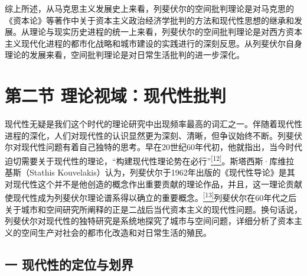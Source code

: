 \documentclass[UTF8, fontset = sourcesans, a4paper, oneside, zihao =
-4, scheme=chinese, no-math, space=true]{ctexbook}
\begin{document}
综上所述，从马克思主义发展史上来看，列斐伏尔的空间批判理论是对马克思的《资本论》等著作中关于资本主义政治经济学批判的方法和现代性思想的继承和发展。从理论与现实历史进程的统一上来看，列斐伏尔的空间批判理论是对西方资本主义现代化进程的都市化战略和城市建设的实践进行的深刻反思。从列斐伏尔自身理论的发展来看，空间批判理论是对日常生活批判的进一步深化。

\protect\hypertarget{part0005_split_002.html}{}{}

\hypertarget{part0005_split_002.htmlux5cux23b002}{\section{第二节
理论视域：现代性批判}\label{part0005_split_002.htmlux5cux23b002}}

现代性无疑是我们这个时代的理论研究中出现频率最高的词汇之一。伴随着现代性进程的深化，人们对现代性的认识显然更为深刻、清晰，但争议始终不断。列斐伏尔对现代性问题有着自己独特的思考。早在20世纪60年代初，他就指出，当今时代迫切需要关于现代性的理论，``构建现代性理论势在必行''\protect\hypertarget{part0005_split_002.htmlux5cux23w12}{}{}\protect\hyperlink{part0005_split_003.htmlux5cux23m12}{\textsuperscript{{[}12{]}}}。斯塔西斯·库维拉基斯（Stathis
Kouvelakis）认为，列斐伏尔于1962年出版的《现代性导论》是其对现代性这个并不是他创造的概念作出重要贡献的理论作品，并且，这一理论贡献使现代性成为列斐伏尔理论谱系得以确立的重要概念。\protect\hypertarget{part0005_split_002.htmlux5cux23w13}{}{}\protect\hyperlink{part0005_split_003.htmlux5cux23m13}{\textsuperscript{{[}13{]}}}列斐伏尔在60年代之后关于城市和空间研究所阐释的正是二战后当代资本主义的现代性问题。换句话说，列斐伏尔对现代性的独特研究是系统地探究了城市与空间问题，详细分析了资本主义的空间生产对社会的都市化改造和对日常生活的殖民。

\subsection{一
现代性的定位与划界}\label{part0005_split_002.htmlux5cux23c006}
\end{document}
